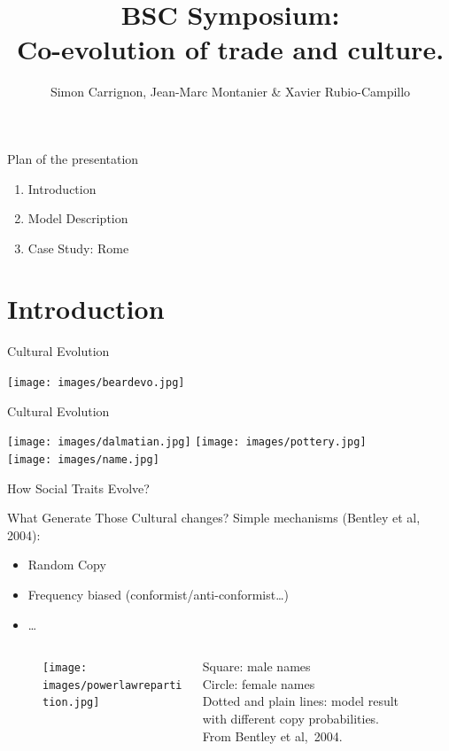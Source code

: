 \documentclass[12pt, handout=show,notes=show]{beamer}
\title{
	BSC Symposium:\\
	Co-evolution of trade and culture.
}
\institute{May 2016}
\author{Simon Carrignon, Jean-Marc Montanier \& Xavier Rubio-Campillo}
\date{
	\scriptsize
	\begin{columns}
		\begin{column}{.3\textwidth}
			\begin{center}
				Barcelona Supercomputing Center	\\
				\texttt{[image: images/bscLogo.jpg]} \hspace{2cm}
			\end{center}
		\end{column}
		\begin{column}{.3\textwidth}
			\begin{center}
				Univ. Pompeu Fabra Complex System Lab.\\
				\texttt{[image: images/upfLogo.jpeg]} %
			\end{center}
		\end{column}
	\end{columns}

}
\begin{document}
\begin{frame}
	\maketitle

\end{frame}

\begin{frame}{Plan of the presentation}
	\begin{enumerate}
		\item Introduction
			\vfill
		\item Model Description
			\vfill
		\item Case Study: Rome
			\vfill
	\end{enumerate}
	
\end{frame}

\section{Introduction}
\begin{frame}{Cultural Evolution}
	\begin{center}
		\texttt{[image: images/beardevo.jpg]} 
	\end{center}
\end{frame}

\begin{frame}{Cultural Evolution}
	\begin{center}
		\texttt{[image: images/dalmatian.jpg]} \hspace{2cm}
		\texttt{[image: images/pottery.jpg]}\\
		\vspace{1cm}
		\texttt{[image: images/name.jpg]}
	\end{center}
	How Social Traits Evolve?
\end{frame}

\begin{frame}{What Generate Those Cultural changes?}
	Simple mechanisms (Bentley et al, 2004):
	\begin{itemize}
		\item Random Copy 
		\item Frequency biased (conformist/anti-conformist\dots)
		\item \dots	
	\end{itemize}
	\begin{figure}
		\begin{columns}
			\begin{column}{.8\textwidth}
				\centering
				\texttt{[image: images/powerlawrepartition.jpg]}
			\end{column}
			\begin{column}{.3\textwidth}
				\tiny
				Square: male names\\
				Circle: female names\\
				Dotted and plain lines: model result with different copy probabilities.\\
			From Bentley et al,~2004.
			\end{column}
		\end{columns}
	\end{figure}
\end{frame}
\end{document}
